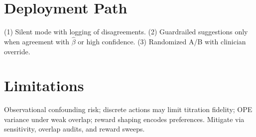 \documentclass[11pt]{article}
\begin{document}
\section{Deployment Path}
(1) Silent mode with logging of disagreements. (2) Guardrailed suggestions only when agreement with $\hat\beta$ or high confidence. (3) Randomized A/B with clinician override.

\section{Limitations}
Observational confounding risk; discrete actions may limit titration fidelity; OPE variance under weak overlap; reward shaping encodes preferences. Mitigate via sensitivity, overlap audits, and reward sweeps.



\end{document}
